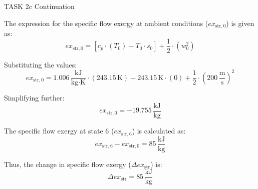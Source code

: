 TASK 2c  
Continuation  

The expression for the specific flow exergy at ambient conditions (\( ex_{\text{str},0} \)) is given as:  
\[
ex_{\text{str},0} = \left[ c_p \cdot (T_0) - T_0 \cdot s_0 \right] + \frac{1}{2} \cdot \left( w_0^2 \right)
\]

Substituting the values:  
\[
ex_{\text{str},0} = 1.006 \, \frac{\text{kJ}}{\text{kg·K}} \cdot (243.15 \, \text{K}) - 243.15 \, \text{K} \cdot (0) + \frac{1}{2} \cdot (200 \, \frac{\text{m}}{\text{s}})^2
\]

Simplifying further:  
\[
ex_{\text{str},0} = -19.755 \, \frac{\text{kJ}}{\text{kg}}
\]

The specific flow exergy at state 6 (\( ex_{\text{str},6} \)) is calculated as:  
\[
ex_{\text{str},6} - ex_{\text{str},0} = 85 \, \frac{\text{kJ}}{\text{kg}}
\]

Thus, the change in specific flow exergy (\( \Delta ex_{\text{str}} \)) is:  
\[
\Delta ex_{\text{str}} = 85 \, \frac{\text{kJ}}{\text{kg}}
\]